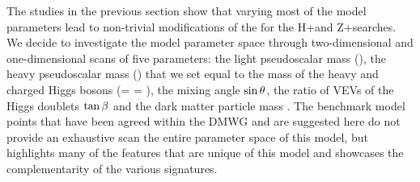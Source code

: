 
%
%
%
%
%
%
%
%
%
%
%


The studies in the previous section show that varying most of the model parameters lead to non-trivial modifications of the for the H+\MET and Z+\MET searches. 
We decide to investigate the model parameter space through two-dimensional and one-dimensional scans of five parameters: the light pseudoscalar mass (\ma), the heavy pseudoscalar mass (\mA) that we set equal to the mass of the heavy and charged Higgs bosons (\mA = \mH = \mHc), the mixing angle $\sin\theta$, the ratio of VEVs of the Higgs doublets $\tan\beta$ and the dark matter particle mass \mDM. 
The benchmark model points that have been agreed within the DMWG and are suggested here do not provide an exhaustive scan the entire parameter space of this model, but highlights many of the features that are unique of this model and showcases the complementarity of the various signatures. 

